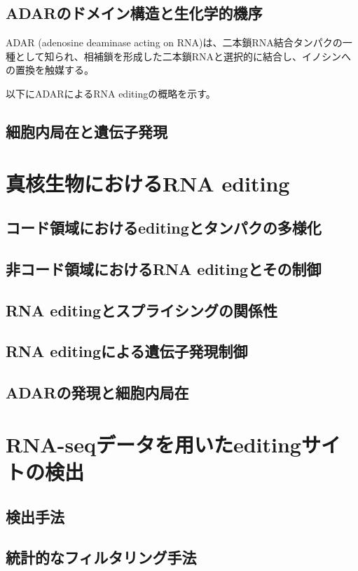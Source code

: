 \subsection{ADARのドメイン構造と生化学的機序}
ADAR (adenosine deaminase acting on RNA)は、二本鎖RNA結合タンパクの一種として知られ、相補鎖を形成した二本鎖RNAと選択的に結合し、イノシンへの置換を触媒する。

以下にADARによるRNA editingの概略を示す。

\subsection{細胞内局在と遺伝子発現}

\section{真核生物におけるRNA editing}
\subsection{コード領域におけるeditingとタンパクの多様化}
\subsection{非コード領域におけるRNA editingとその制御}
\subsection{RNA editingとスプライシングの関係性}
\subsection{RNA editingによる遺伝子発現制御}
\subsection{ADARの発現と細胞内局在}

\section{RNA-seqデータを用いたeditingサイトの検出}
\subsection{検出手法}
\subsection{統計的なフィルタリング手法}
